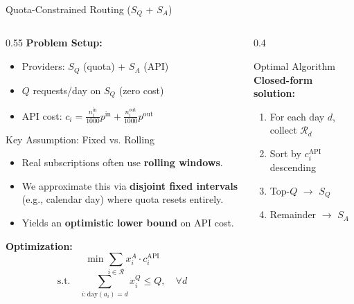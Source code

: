 \documentclass[aspectratio=169,10pt]{beamer}
\begin{document}
\begin{frame}{Quota-Constrained Routing ($S_Q$ + $S_A$)}
\begin{columns}[T]
\begin{column}{0.55\textwidth}
\textbf{Problem Setup:}
\begin{itemize}\setlength{\itemsep}{1pt}
    \item Providers: $S_Q$ (quota) + $S_A$ (API)
    \item $Q$ requests/day on $S_Q$ (zero cost)
    \item API cost: $c_i = \frac{n_i^{\text{in}}}{1000} p^{\text{in}} + \frac{n_i^{\text{out}}}{1000} p^{\text{out}}$
\end{itemize}

\vspace{0.1cm}
\begin{exampleblock}{Key Assumption: Fixed vs. Rolling}
\footnotesize
\begin{itemize}\setlength{\itemsep}{1pt}
    \item Real subscriptions often use \textbf{rolling windows}.
    \item We approximate this via \textbf{disjoint fixed intervals} (e.g., calendar day) where quota resets entirely.
    \item Yields an \textbf{optimistic lower bound} on API cost.
\end{itemize}
\end{exampleblock}

\vspace{0.1cm}
\textbf{Optimization:}
\vspace{-0.2cm}
\begin{equation*}
\min \sum_{i \in \mathcal{R}} x_i^A \cdot c_i^{\text{API}}
\end{equation*}
\vspace{-0.4cm}
\begin{equation*}
\text{s.t.} \quad \sum_{i: \text{day}(a_i)=d} x_i^Q \leq Q, \quad \forall d
\end{equation*}

\end{column}

\begin{column}{0.4\textwidth}
\begin{block}{Optimal Algorithm}
\footnotesize
\textbf{Closed-form solution:}
\begin{enumerate}\setlength{\itemsep}{1pt}
    \item For each day $d$, collect $\mathcal{R}_d$
    \item Sort by $c_i^{\text{API}}$ descending
    \item Top-$Q$ $\rightarrow$ $S_Q$
    \item Remainder $\rightarrow$ $S_A$
\end{enumerate}
\end{block}


\end{column}
\end{columns}
\end{frame}
\end{document}
